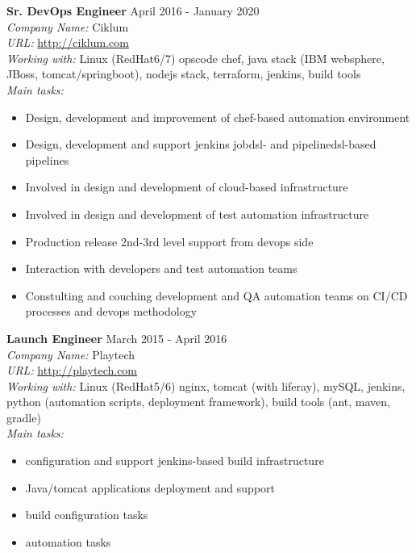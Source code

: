 \documentclass[mymargin,10pt]{res} %
\begin{document}
\begin{resume}
{\bf Sr. DevOps Engineer} \hfill April 2016 - January 2020 \\
{\sl Company Name:} Ciklum \\
{\sl URL:} \url{http://ciklum.com} \\
{\sl Working with:} Linux (RedHat6/7) opscode chef, java stack (IBM websphere, JBoss, tomcat/springboot), nodejs stack, terraform, jenkins, build tools \\
{\sl Main tasks:}
\begin{itemize}
\item Design, development and improvement of chef-based automation environment
\item Design, development and support jenkins jobdsl- and pipelinedsl-based pipelines
\item Involved in design and development of cloud-based infrastructure
\item Involved in design and development of test automation infrastructure
\item Production release 2nd-3rd level support from devops side
\item Interaction with developers and test automation teams
\item Constulting and couching development and QA automation teams on CI/CD processes and devops methodology
\end{itemize}

{\bf Launch Engineer} \hfill March 2015 - April 2016 \\
{\sl Company Name:} Playtech \\
{\sl URL:} \url{http://playtech.com} \\
{\sl Working with:} Linux (RedHat5/6) nginx, tomcat (with liferay), mySQL, jenkins, python (automation scripts, deployment framework), build tools (ant, maven, gradle) \\
{\sl Main tasks:}
\begin{itemize}
\item configuration and support jenkins-based build infrastructure
\item Java/tomcat applications deployment and support
\item build configuration tasks
\item automation tasks
\end{itemize}


\end{resume}
\end{document}
